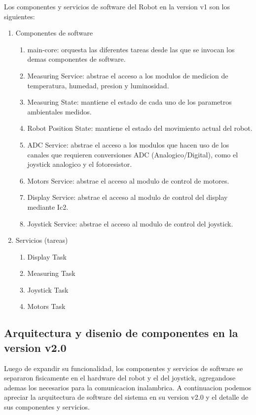 Los componentes y servicios de software del Robot en la version v1 son los siguientes:

\begin{enumerate}	
	\item Componentes de software
	\begin{enumerate}			
		\item main-core: orquesta las diferentes tareas desde las que se invocan los demas componentes de software.
		\item Measuring Service: abstrae el acceso a los modulos de medicion de temperatura, humedad, presion y luminosidad.
		\item Measuring State: mantiene el estado de cada uno de los parametros ambientales medidos.
		\item Robot Position State: mantiene el estado del movimiento actual del robot.
		\item ADC Service: abstrae el acceso a los modulos que hacen uso de los canales que requieren conversiones ADC (Analogico/Digital), como el joystick analogico y el fotoresistor. 
		\item Motors Service: abstrae el acceso al modulo de control de motores.
		\item Display Service: abstrae el acceso al modulo de control del display mediante Ic2.
		\item Joystick Service: abstrae el acceso al modulo de control del joystick.
	\end{enumerate}	
	\item Servicios (tareas)
	\begin{enumerate}				
		\item Display Task	
		\item Measuring Task		
		\item Joystick Task
		\item Motors Task		
	\end{enumerate}			
\end{enumerate}		

\subsection{Arquitectura y disenio de componentes en la version v2.0}

Luego de expandir su funcionalidad, los componentes y servicios de software se separaron fisicamente en el hardware del robot y el del joystick, agregandose ademas los necesarios para la comunicacion inalambrica. A continuacion podemos apreciar la arquitectura de software del sistema en su version v2.0 y el detalle de sus componentes y servicios.

